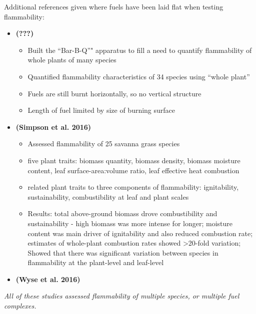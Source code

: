 \documentclass[11pt,a4paper]{article}
\begin{document}
Additional references given where fuels have been laid flat when testing
flammability:

\begin{itemize}
\item
  \textbf{({\textbf{???}})}

  \begin{itemize}
  \item
    Built the ``Bar-B-Q''" apparatus to fill a need to quantify
    flammability of whole plants of many species
  \item
    Quantified flammability characteristics of 34 species using ``whole
    plant''
  \item
    Fuels are still burnt horizontally, so no vertical structure
  \item
    Length of fuel limited by size of burning surface
  \end{itemize}
\item
  \textbf{(Simpson et al. 2016)}

  \begin{itemize}
  \item
    Assessed flammability of 25 savanna grass species
  \item
    five plant traits: biomass quantity, biomass density, biomass
    moisture content, leaf surface-area:volume ratio, leaf effective
    heat combustion
  \item
    related plant traits to three components of flammability:
    ignitability, sustainability, combustibility at leaf and plant
    scales
  \item
    Results: total above-ground biomass drove combustibility and
    sustainability - high biomass was more intense for longer; moisture
    content was main driver of ignitability and also reduced combustion
    rate; estimates of whole-plant combustion rates showed
    \textgreater{}20-fold variation; Showed that there was significant
    variation between species in flammability at the plant-level and
    leaf-level
  \end{itemize}
\item
  \textbf{(Wyse et al. 2016)}
\end{itemize}

\emph{All of these studies assessed flammability of multiple species, or
multiple fuel complexes.}
\end{document}
